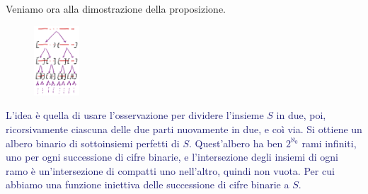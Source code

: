 Veniamo ora alla dimostrazione della proposizione.

\begin{figure}
	\vspace*{-0.8cm}
	\includegraphics[width=0.15\textwidth]{immagini/perfetti di [0,1].png}
\end{figure}
\textcolor{MidnightBlue}{L'idea è quella di usare l'osservazione per dividere l'insieme $S$ in due, poi, ricorsivamente ciascuna delle due parti nuovamente in due, e coì via.
Si ottiene un albero binario di sottoinsiemi perfetti di $S$. Quest'albero ha ben $2^{\aleph_0}$ rami infiniti, uno per ogni successione di cifre binarie, e l'intersezione degli insiemi di ogni ramo 
è un'intersezione di compatti uno nell'altro, quindi non vuota. Per cui abbiamo una funzione iniettiva delle successione di cifre binarie a $S$.}

